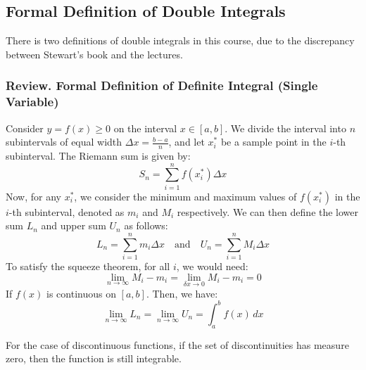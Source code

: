 \documentclass[11pt]{report}
\begin{document}
\subsection{Formal Definition of Double Integrals}
There is two definitions of double integrals in this course, due to the discrepancy between Stewart's book and the lectures. 

\begin{shaded}
    \subsubsection*{\textbf{Review.  } Formal Definition of Definite Integral (Single Variable)}

    Consider $y = f(x) \ge 0$ on the interval $x \in [a,b]$. We divide the interval into $n$ subintervals of equal width $\Delta x = \frac{b-a}{n}$, and let $x_i^*$ be a sample point in the $i$-th subinterval. The Riemann sum is given by:
    $$
        S_n = \sum_{i=1}^n f(x_i^*) \Delta x
    $$
    Now, for any $x_i^*$, we consider the minimum and maximum values of $f(x_i^*)$ in the $i$-th subinterval, denoted as $m_i$ and $M_i$ respectively. We can then define the lower sum $L_n$ and upper sum $U_n$ as follows:
    $$
        L_n = \sum_{i=1}^n m_i \Delta x \quad \text{and} \quad U_n = \sum_{i=1}^n M_i \Delta x
    $$
    To satisfy the squeeze theorem, for all $i$, we would need:
    $$
        \lim_{n \to \infty} M_i - m_i = \lim_{\delta x \to 0} M_i - m_i = 0
    $$
    If $f(x)$ is continuous on $[a,b]$. Then, we have:
    $$
        \lim_{n \to \infty} L_n = \lim_{n \to \infty} U_n = \int_a^b f(x) \, dx
    $$

    For the case of discontinuous functions, if the set of discontinuities has measure zero, then the function is still integrable.
\end{shaded}
\end{document}
